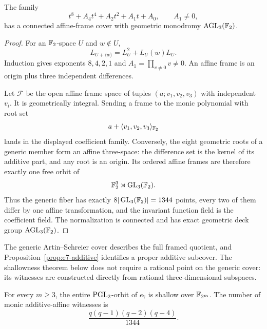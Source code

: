 \begin{proposition}\label{prop:e7-additive}%
%
The family
\[
t^8+A_4t^4+A_2t^2+A_1t+A_0,\qquad A_1\ne0,
\]
has a connected affine-frame cover with geometric monodromy
$\operatorname{AGL}_3(\mathbb F_2)$.
\end{proposition}

\begin{proof}
For an $\mathbb F_2$-space $U$ and $w\notin U$,
\[
L_{U+\langle w\rangle}=L_U^2+L_U(w)L_U.
\]
Induction gives exponents $8,4,2,1$ and
$A_1=\prod_{v\ne0}v\ne0$.  An affine frame is an origin plus three
independent differences.

Let $\mathcal F$ be the open affine frame space of tuples
$(a;v_1,v_2,v_3)$ with independent $v_i$.  It is geometrically
integral.  Sending a frame to the monic polynomial with root set
\[
 a+\langle v_1,v_2,v_3\rangle_{\mathbb F_2}
\]
lands in the displayed coefficient family.  Conversely, the eight
geometric roots of a generic member form an affine three-space: the
difference set is the kernel of its additive part, and any root is an
origin.  Its ordered affine frames are therefore exactly one free
orbit of
\[
 \mathbb F_2^3\rtimes\operatorname{GL}_3(\mathbb F_2).
\]
Thus the generic fiber has exactly
$8|\operatorname{GL}_3(\mathbb F_2)|=1344$ points, every two of them differ
by one affine transformation, and the invariant function field is the
coefficient field.  The normalization is connected and has exact
geometric deck group $\operatorname{AGL}_3(\mathbb F_2)$.
\end{proof}

\begin{remark}
The generic Artin--Schreier cover describes the full framed quotient,
and Proposition~\ref{prop:e7-additive} identifies a proper additive
subcover.  The shallowness theorem below does not require a rational
point on the generic cover: its witnesses are constructed directly
from rational three-dimensional subspaces.
\end{remark}

\begin{theorem}
\label{thm:e7}%
%
For every $m\geq3$, the entire $\operatorname{PGL}_2$-orbit of $e_7$ is shallow over
$\mathbb F_{2^m}$.  The number of monic additive-affine witnesses is
\[
\frac{q(q-1)(q-2)(q-4)}{1344}.
\]
\end{theorem}


